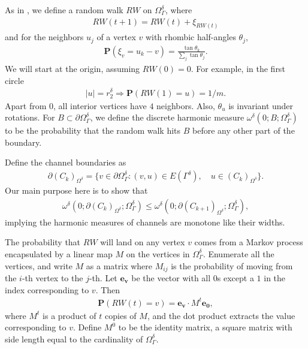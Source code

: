 \documentclass[11pt,reqno]{amsart}
\numberwithin{equation}{section}
\begin{document}
As in \cite[p.~1593]{CS}, we define a random walk $RW$ on $\varOmega_{\varGamma}^{\delta}$, where
\begin{align}
RW(t+1) = RW(t) + \xi_{RW(t)}
\end{align}
and for the neighbors $u_j$ of a vertex $v$ with rhombic half-angles $\theta_j$,
\begin{align} \label{angles}
\mathbf{P}(\xi_v = u_k - v) = \frac{\tan \theta_k}{\sum_j \tan \theta_j}.
\end{align}
We will start at the origin, assuming $RW(0) = 0$. For example, in the first circle
\begin{align}
|u| = r_2^{\delta} \Rightarrow \mathbf{P}(RW(1) = u) = 1/m.
\end{align}
Apart from $0$, all interior vertices have $4$ neighbors.
Also, $\theta_u$ is invariant under rotations. For $B \subset \partial\varOmega_{\varGamma}^{\delta}$, we define the discrete harmonic measure $\omega^{\delta}(0;B;\varOmega^{\delta}_{\varGamma})$ to be the probability that the random walk hits $B$ before any other part of the boundary.

Define the channel boundaries as
\begin{align}
\partial (C_k)_{\Omega^{\delta}} = \{ v \in \partial \varOmega_{\varGamma}^{\delta} : (v,u) \in E(\varGamma^{\delta}), \quad u \in (C_k)_{\Omega^{\delta}} \}.
\end{align}
Our main purpose here is to show that
\begin{align} \label{channel_monotone}
\omega^{\delta}(0 ; \partial (C_k)_{\Omega^{\delta}}; \varOmega^{\delta}_{\varGamma}) \le \omega^{\delta}(0 ; \partial (C_{k+1})_{\Omega^{\delta}}; \varOmega^{\delta}_{\varGamma}),
\end{align}
implying the harmonic measures of channels are monotone like their widths.

The probability that $RW$ will land on any vertex $v$ comes from a Markov process encapsulated by a linear map $M$ on the vertices in $\varOmega^{\delta}_{\varGamma}$. Enumerate all the vertices, and write $M$ as a matrix where $M_{ij}$ is the probability of moving from the $i$-th vertex to the $j$-th. Let $\mathbf{e_v}$ be the vector with all $0$s except a $1$ in the index corresponding to $v$. Then
\begin{align}
\mathbf{P}(RW(t) = v) = \mathbf{e_v} \cdot M^t \mathbf{e_0},
\end{align}
where $M^t$ is a product of $t$ copies of $M$, and the dot product extracts the value corresponding to $v$. Define $M^0$ to be the identity matrix, a square matrix with side length equal to the cardinality of $\varOmega^{\delta}_{\varGamma}$.
\end{document}
